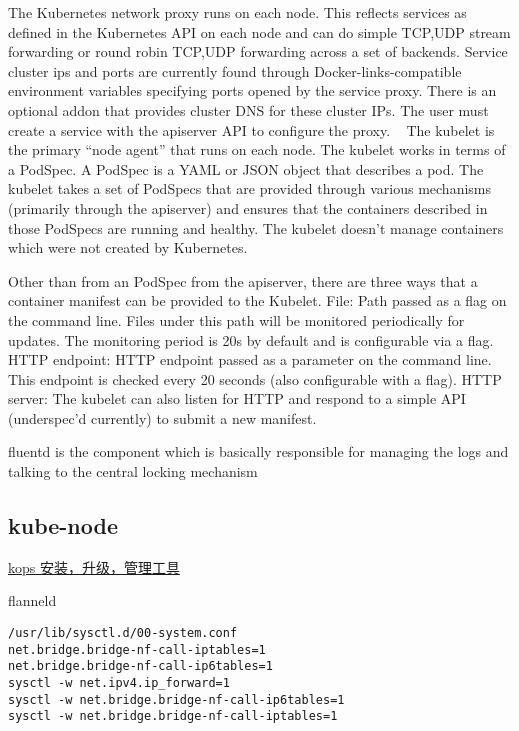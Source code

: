 The Kubernetes network proxy runs on each node. This reflects services as defined in the Kubernetes API on each node and can do simple TCP,UDP stream forwarding or round robin TCP,UDP forwarding across a set of backends. Service cluster ips and ports are currently found through Docker-links-compatible environment variables specifying ports opened by the service proxy. There is an optional addon that provides cluster DNS for these cluster IPs. The user must create a service with the apiserver API to configure the proxy.
 
The kubelet is the primary “node agent” that runs on each node. The kubelet works in terms of a PodSpec. A PodSpec is a YAML or JSON object that describes a pod. The kubelet takes a set of PodSpecs that are provided through various mechanisms (primarily through the apiserver) and ensures that the containers described in those PodSpecs are running and healthy. The kubelet doesn’t manage containers which were not created by Kubernetes.

Other than from an PodSpec from the apiserver, there are three ways that a container manifest can be provided to the Kubelet.
File: Path passed as a flag on the command line. Files under this path will be monitored periodically for updates. The monitoring period is 20s by default and is configurable via a flag.
HTTP endpoint: HTTP endpoint passed as a parameter on the command line. This endpoint is checked every 20 seconds (also configurable with a flag).
HTTP server: The kubelet can also listen for HTTP and respond to a simple API (underspec’d currently) to submit a new manifest.

fluentd is the component which is basically responsible for managing the logs and talking to the central locking mechanism

\subsection{kube-node}



\href{https://github.com/kubernetes/kops}{kops   安装，升级，管理工具}


flanneld

\begin{lstlisting}
/usr/lib/sysctl.d/00-system.conf
net.bridge.bridge-nf-call-iptables=1
net.bridge.bridge-nf-call-ip6tables=1
sysctl -w net.ipv4.ip_forward=1
sysctl -w net.bridge.bridge-nf-call-ip6tables=1
sysctl -w net.bridge.bridge-nf-call-iptables=1
\end{lstlisting}

